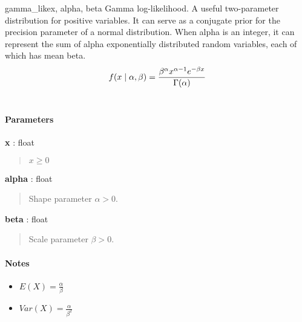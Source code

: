 \hypertarget{pymc.distributions.gamma_like}{}
\begin{funcdesc}{gamma\_like}{x, alpha, beta}
Gamma log-likelihood. A useful two-parameter distribution for positive variables. It can serve as a conjugate prior for the precision parameter of a normal distribution. When alpha is an integer, it can represent the sum of alpha exponentially distributed random variables, each of which has mean beta.
\begin{gather}
\begin{split}f(x \mid \alpha, \beta) = \frac{\beta^{\alpha}x^{\alpha-1}e^{-\beta x}}{\Gamma(\alpha)}\end{split}\notag\\\begin{split}\end{split}\notag
\end{gather}
\paragraph{Parameters}
\begin{paramlist}
\item[] \textbf{x} : float
\begin{quote}

$x \ge 0$
\end{quote}

\item[] \textbf{alpha} : float
\begin{quote}

Shape parameter $\alpha > 0$.
\end{quote}

\item[] \textbf{beta} : float
\begin{quote}

Scale parameter $\beta > 0$.
\end{quote}
\end{paramlist}
\paragraph{Notes}
\begin{itemize}
\item {} 
$E(X) = \frac{\alpha}{\beta}$

\item {} 
$Var(X) = \frac{\alpha}{\beta^2}$

\end{itemize}
\end{funcdesc}

